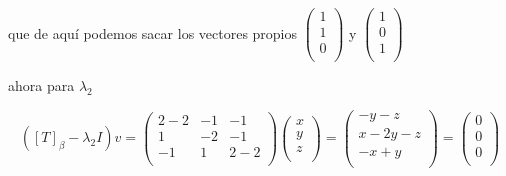 \documentclass[12pt,a4paper]{article}
\begin{document}
\begin{enumerate}
    que de aquí podemos sacar los vectores propios $\left(\begin{array}{cc}
         1  \\
         1 \\
         0 \\
    \end{array}\right)$ y $\left(\begin{array}{cc}
         1 \\
         0 \\
         1 \\
    \end{array}\right)$
    
    ahora para $\lambda_2$
    
    \begin{equation*}
        ([T]_\beta - \lambda_2 I)v = \left(\begin{array}{lcc}
             2- 2 & -1 & -1 \\
             1 & -2 & -1 \\
             -1 & 1 & 2-2 \\
        \end{array}\right)\left(\begin{array}{lcc}
             x  \\
             y \\
             z \\
        \end{array}\right) = \left(\begin{array}{lcc}
             -y-z \\
             x-2y-z \\
             -x+y \\
        \end{array}\right) =\left(\begin{array}{lcc}
             0  \\
             0 \\
             0 \\
        \end{array} \right)
    \end{equation*}
    

\end{enumerate}
\end{document}
